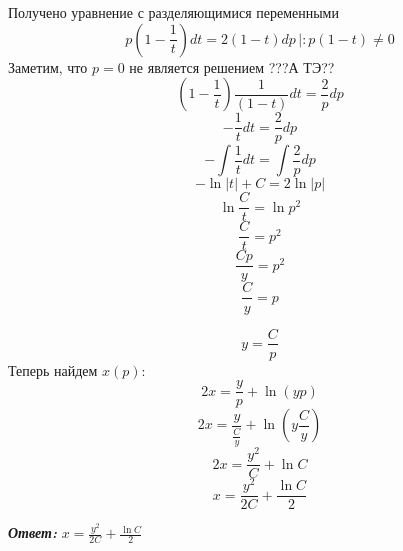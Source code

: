 \documentclass[a5paper, 10pt]{article}
\theoremstyle{definition}
\theoremstyle{plain}
\theoremstyle{remark}
\begin{document}
Получено уравнение с разделяющимися переменными
\begin{equation*}
 p \left(1  - \frac{ 1}{t} \right) dt  = 2 (1  - t) dp \, \left| : p (1  - t) \neq 0 \right.
\end{equation*}
Заметим, что $p = 0$ не является решением ???А ТЭ??
\begin{equation*}
  \left(1  - \frac{ 1}{t} \right) \frac{1}{ (1  - t) } dt  =  \frac{2}{p} dp 
\end{equation*}
\begin{equation*}
 - \frac{1}{ t } dt  =  \frac{2}{p} dp 
\end{equation*}
\begin{equation*}
 - \int \frac{1}{ t } dt  = \int \frac{2}{p} dp 
\end{equation*}
\begin{equation*}
 - \ln | t| + C  = 2 \ln| p|
\end{equation*}
\begin{equation*}
 \ln \frac{C}{t}  =  \ln p^2
\end{equation*}
\begin{equation*}
  \frac{C}{t}  =   p^2
\end{equation*}
\begin{equation*}
  \frac{Cp}{y}  =   p^2
\end{equation*}
\begin{equation*}
  \frac{C}{y}  =   p
\end{equation*}

\begin{equation*}
 y   =   \frac{C}{p}
\end{equation*}
Теперь найдем $x(p)$:
\begin{equation*}
2x = \frac{y}{p} + \ln (yp)
\end{equation*}
\begin{equation*}
2x = \frac{ y}{ \frac{C}{y}} + \ln ( y  \frac{C}{y})
\end{equation*}
\begin{equation*}
2x = \frac{ y^2}{C} + \ln  C
\end{equation*}
\begin{equation*}
x = \frac{ y^2}{2C} +  \frac {\ln  C}{2}
\end{equation*}

\textit{\textbf{Ответ:}} $x = \frac{ y^2}{2C} +  \frac {\ln  C}{2}$
\end{document}
